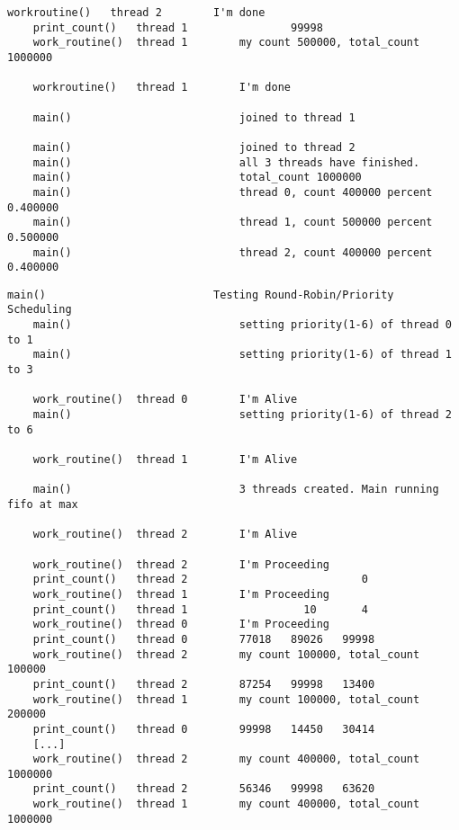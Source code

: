 \begin{parts}
\begin{solution}
\begin{Verbatim}[label={\$ sudo ./prog1 r}, fontsize=\small]
    workroutine()   thread 2        I'm done
    print_count()   thread 1                99998
    work_routine()  thread 1        my count 500000, total_count 1000000
    
    workroutine()   thread 1        I'm done
    
    main()                          joined to thread 1 
    
    main()                          joined to thread 2 
    main()                          all 3 threads have finished. 
    main()                          total_count 1000000
    main()                          thread 0, count 400000 percent 0.400000
    main()                          thread 1, count 500000 percent 0.500000
    main()                          thread 2, count 400000 percent 0.400000
    \end{Verbatim}
    \vspace{0.1em}
    \begin{Verbatim}[label={\$ sudo ./prog1 t}, fontsize=\small]
    main()                          Testing Round-Robin/Priority Scheduling
    main()                          setting priority(1-6) of thread 0 to 1
    main()                          setting priority(1-6) of thread 1 to 3
    
    work_routine()  thread 0        I'm Alive
    main()                          setting priority(1-6) of thread 2 to 6
    
    work_routine()  thread 1        I'm Alive
    
    main()                          3 threads created. Main running fifo at max
    
    work_routine()  thread 2        I'm Alive
    
    work_routine()  thread 2        I'm Proceeding
    print_count()   thread 2                           0
    work_routine()  thread 1        I'm Proceeding
    print_count()   thread 1                  10       4
    work_routine()  thread 0        I'm Proceeding
    print_count()   thread 0        77018   89026   99998
    work_routine()  thread 2        my count 100000, total_count 100000
    print_count()   thread 2        87254   99998   13400
    work_routine()  thread 1        my count 100000, total_count 200000
    print_count()   thread 0        99998   14450   30414
    [...]
    work_routine()  thread 2        my count 400000, total_count 1000000
    print_count()   thread 2        56346   99998   63620
    work_routine()  thread 1        my count 400000, total_count 1000000
    

\end{Verbatim}
\end{solution}
\end{parts}
